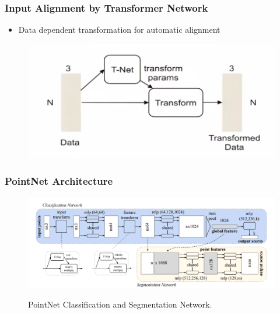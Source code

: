 \documentclass[10pt,fleqn,unknownkeysallowed]{beamer}
\begin{document}
\begin{frame}
	\frametitle{Input Alignment by Transformer Network}
	\linespread{1.5}
    \begin{itemize}
        \item Data dependent transformation for automatic alignment
    \end{itemize}
    \begin{figure}
		\includegraphics[width=0.8\linewidth]{images/pointnet/t-Net} \\
	\end{figure}
\end{frame}

\begin{frame}
	\frametitle{PointNet Architecture}
	\linespread{1.5}
	\begin{figure}
		\includegraphics[width=1.0\linewidth]{images/pointnet/pointnet_arch} \\
		\caption{PointNet Classification and Segmentation Network.}
	\end{figure}
\end{frame}
\end{document}
